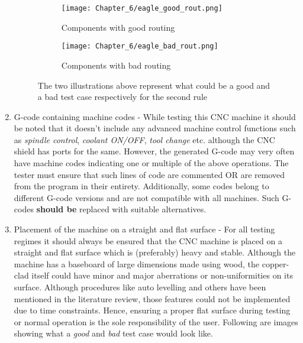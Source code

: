 \begin{enumerate}
       \begin{figure}[h]

        \begin{subfigure}{0.5\textwidth}
         \hspace{8mm}
         \texttt{[image: Chapter\_6/eagle\_good\_rout.png]}
         \caption{Components with good routing}
         \label{fig:grout}
        \end{subfigure}
        \begin{subfigure}{0.5\textwidth}
         \hspace{8mm}
         \texttt{[image: Chapter\_6/eagle\_bad\_rout.png]}
         \caption{Components with bad routing}
         \label{fig:brout}
        \end{subfigure}

        \caption{The two illustrations above represent what could be a good and a bad test case respectively for the second rule}
        \label{fig:gbrout}
       \end{figure}

 \item G-code containing machine codes - While testing this CNC machine it should be noted that it doesn’t include any advanced machine control functions such as \textit{spindle control}, \textit{coolant ON/OFF}, \textit{tool change} etc. although the CNC shield has ports for the same. However, the generated G-code may very often have machine codes indicating one or multiple of the above operations. The tester must ensure that such lines of code are commented OR are removed from the program in their entirety. Additionally, some codes belong to different G-code versions and are not compatible with all machines. Such G-codes \textbf{should be} replaced with suitable alternatives.

 \item Placement of the machine on a straight and flat surface - For all testing regimes it should always be ensured that the CNC machine is placed on a straight and flat surface which is (preferably) heavy and stable. Although the machine has a baseboard of large dimensions made using wood, the copper-clad itself could have minor and major aberrations or non-uniformities on its surface. Although procedures like auto levelling and others have been mentioned in the literature review, those features could not be implemented due to time constraints. Hence, ensuring a proper flat surface during testing or normal operation is the sole responsibility of the user. Following are images showing what a \textit{good} and \textit{bad} test case would look like. \pagebreak


\end{enumerate}
